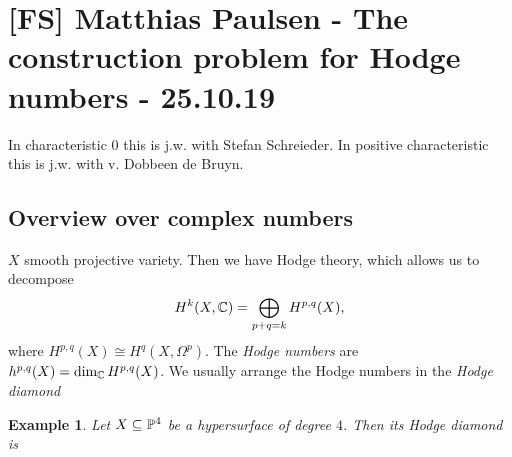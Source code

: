 \documentclass[A4paper, british]{amsart}
\theoremstyle{darkgreentheorem}
\theoremstyle{darkbluedefinition}
\theoremstyle{darkredexample}
\newtheorem{exa}[thm]{Example}
\theoremstyle{remark}
\newcommand{\1}{\mathbbm{1}}
\begin{document}
\section{[FS] Matthias Paulsen - The construction problem for Hodge numbers - 25.10.19}

In characteristic $0$ this is j.w. with Stefan Schreieder.
In positive characteristic this is j.w. with v. Dobbeen de Bruyn.

\subsection{Overview over complex numbers}

$X$ smooth projective variety.
Then we have Hodge theory, which allows us to decompose
\[ H^{k}(X,\C)=\bigoplus_{p+q=k}H^{p,q}(X), \]
where $H^{p,q}(X)\cong H^{q}(X,\Omega^{p})$.
The \textit{Hodge numbers} are $h^{p,q}(X)=\dim_{\C}H^{p,q}(X)$.
We usually arrange the Hodge numbers in the \textit{Hodge diamond}
\begin{center}
\end{center}

\begin{exa}
    Let $X\subseteq \P^{4}$ be a hypersurface of degree $4$.
    Then its Hodge diamond is
    \begin{center}
    \end{center}
\end{exa}
\end{document}
